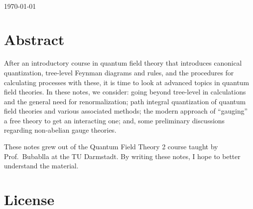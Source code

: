 \documentclass[12pt]{memoir}
\begin{document}
\begin{titlingpage}
\begin{minipage}{0.4\textwidth}
\end{minipage}\\[2cm]



{\large \today}\\[2cm] %

\vfill %

\end{titlingpage}


\chapter{Abstract}
After an introductory course in quantum field theory
that introduces canonical quantization,
tree-level Feynman diagrams and rules,
and the procedures for calculating processes with these,
it is time to look at advanced topics in quantum field theories.
In these notes, we consider:
going beyond tree-level in calculations and the general need for renormalization;
path integral quantization of quantum field theories and various associated methods;
the modern approach of ``gauging'' a free theory to get an interacting one;
and, some preliminary discussions regarding non-abelian gauge theories.

These notes grew out of the Quantum Field Theory 2 course
taught by Prof.~Bubablla at the TU Darmstadt.
By writing these notes, I hope to better understand the material.

\chapter{License}
\doclicenseThis{}




\cleardoublepage\tableofcontents
\end{document}
